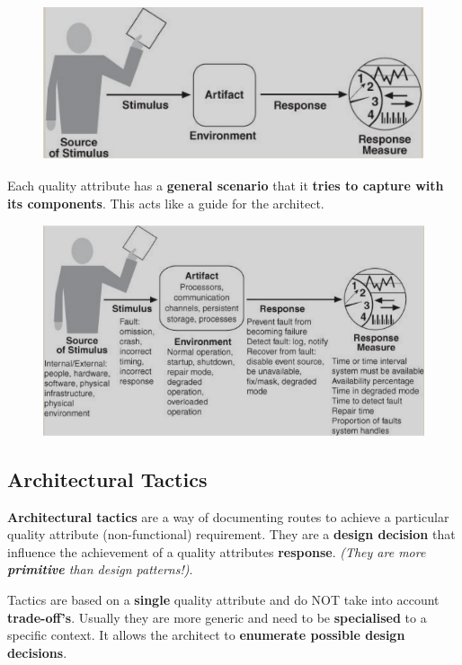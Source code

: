 \documentclass[a4paper]{article}
\begin{document}
\begin{figure}[H]
\centering 
\includegraphics[scale=0.7]{images/QA-general.png}
\end{figure}

Each quality attribute has a \textbf{general scenario} that it \textbf{tries to capture with its components}. This acts like a guide for the architect.

\begin{figure}[H]
\centering 
\includegraphics[scale=0.7]{images/availability-general.png}
\end{figure}

\subsection{Architectural Tactics}
\textbf{Architectural tactics} are a way of documenting routes to achieve a particular quality attribute (non-functional) requirement. They are a \textbf{design decision} that influence the achievement of a quality attributes \textbf{response}. \textit{(They are more \textbf{primitive} than design patterns!)}.

Tactics are based on a \textbf{single} quality attribute and do NOT take into account \textbf{trade-off's}. Usually they are more generic and need to be \textbf{specialised} to a specific context. It allows the architect to \textbf{enumerate possible design decisions}.
\end{document}
